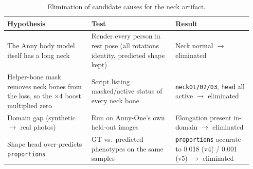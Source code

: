 
\begin{table}[h]
\centering\small
\begin{tabular}{p{3.2cm}p{5.2cm}p{4.6cm}}
\toprule
Hypothesis & Test & Result \\
\midrule
The Anny body model itself has a long neck &
Render every person in rest pose (all rotations identity, predicted shape kept) &
Neck normal $\rightarrow$ eliminated \\
Helper-bone mask removes neck bones from the loss, so the $\times4$ boost multiplied zero &
Script listing masked/active status of every neck bone &
\texttt{neck01/02/03}, \texttt{head} all active $\rightarrow$ eliminated \\
Domain gap (synthetic $\rightarrow$ real photos) &
Run on Anny-One's own held-out images &
Elongation present in-domain $\rightarrow$ eliminated \\
Shape head over-predicts \texttt{proportions} &
GT vs.\ predicted phenotypes on the same samples &
\texttt{proportions} accurate to 0.018 (v4) / 0.001 (v5) $\rightarrow$ eliminated \\
\bottomrule
\end{tabular}
\caption{Elimination of candidate causes for the neck artifact.}
\label{tab:neck}
\end{table}

